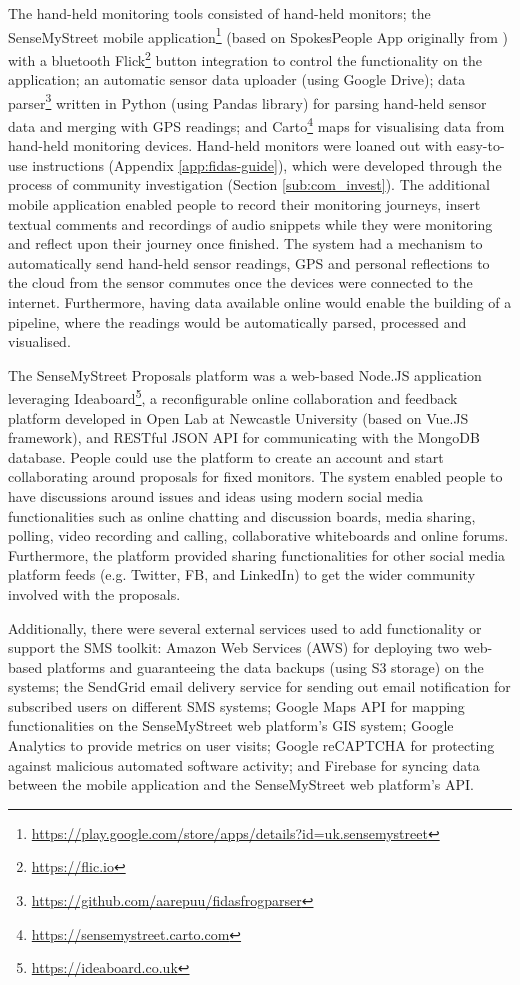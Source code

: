 The hand-held monitoring tools consisted of hand-held monitors; the SenseMyStreet mobile application\footnote{\url{https://play.google.com/store/apps/details?id=uk.sensemystreet}} (based on SpokesPeople App originally from \citet{maskell_spokespeople:_2018}) with a bluetooth Flick\footnote{\url{https://flic.io}} button integration to control the functionality on the application; an automatic sensor data uploader (using Google Drive); data parser\footnote{\url{https://github.com/aarepuu/fidasfrogparser}} written in Python (using Pandas library) for parsing hand-held sensor data and merging with GPS readings; and Carto\footnote{\url{https://sensemystreet.carto.com}} maps for visualising data from hand-held monitoring devices. Hand-held monitors were loaned out with easy-to-use instructions (Appendix \ref{app:fidas-guide}), which were developed through the process of community investigation (Section \ref{sub:com_invest}). The additional mobile application enabled people to record their monitoring journeys, insert textual comments and recordings of audio snippets while they were monitoring and reflect upon their journey once finished. The system had a mechanism to automatically send hand-held sensor readings, GPS and personal reflections to the cloud from the sensor commutes once the devices were connected to the internet. Furthermore, having data available online would enable the building of a pipeline, where the readings would be automatically parsed, processed and visualised.

The SenseMyStreet Proposals platform was a web-based Node.JS application leveraging Ideaboard\footnote{\url{https://ideaboard.co.uk}}, a reconfigurable online collaboration and feedback platform developed in Open Lab at Newcastle University (based on Vue.JS framework), and RESTful JSON API for communicating with the MongoDB database. People could use the platform to create an account and start collaborating around proposals for fixed monitors. The system enabled people to have discussions around issues and ideas using modern social media functionalities such as online chatting and discussion boards, media sharing, polling, video recording and calling, collaborative whiteboards and online forums. Furthermore, the platform provided sharing functionalities for other social media platform feeds (e.g. Twitter, FB, and LinkedIn) to get the wider community involved with the proposals.

Additionally, there were several external services used to add functionality or support the SMS toolkit: Amazon Web Services (AWS) for deploying two web-based platforms and guaranteeing the data backups (using S3 storage) on the systems; the SendGrid email delivery service for sending out email notification for subscribed users on different SMS systems; Google Maps API for mapping functionalities on the SenseMyStreet web platform's GIS system; Google Analytics to provide metrics on user visits; Google reCAPTCHA for protecting against malicious automated software activity; and Firebase for syncing data between the mobile application and the SenseMyStreet web platform's API.

